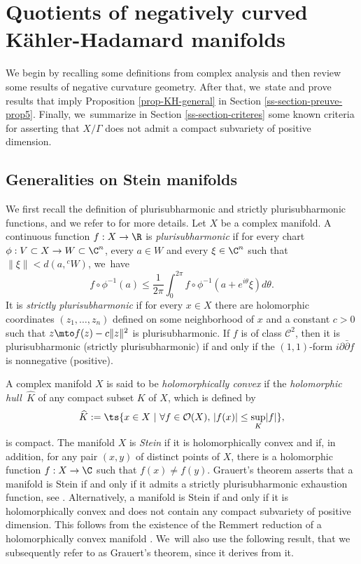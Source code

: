 \section{Quotients of negatively curved Kähler-Hadamard manifolds}\label{section-kahler-hadamard}

We begin by recalling some definitions from complex analysis and then review some results of negative curvature geometry. After that, we~state and prove results that imply Proposition \ref{prop-KH-general} in Section \ref{ss-section-preuve-prop5}. Finally, we~summarize in Section \ref{ss-section-criteres} some known criteria for asserting that $X/\Gamma$ does not admit a compact subvariety of positive dimension.

\subsection{Generalities on Stein manifolds}\label{ss-section-stein}

We first recall the definition of plurisubharmonic and strictly plurisubharmonic functions, and we refer to \cite[Ch.\,1]{demaillyComplexAnalyticDifferential-manuel} for more details. Let $X$ be a complex manifold. A continuous function $f:X\to \R$ is \textit{plurisubharmonic} if for every chart $\phi:V\subset X\to W\subset \C^{n}$, every $a\in W$ and every $\xi\in \C^{n}$ such that $\lVert \xi\rVert < d(a,{}^{c}W)$, we~have
\begin{equation*}
f\circ\phi^{-1}(a) \le \frac{1}{2\pi}\int_{0}^{2\pi}f\circ\phi^{-1}(a+e^{i\theta}\xi)d\theta.
\end{equation*}
It is \textit{strictly plurisubharmonic} if for every $x\in X$ there are holomorphic coordinates $(z_1,\dots,z_n)$ defined on some neighborhood of $x$ and a constant $c>0$ such that $z\mto f(z)-c\lVert z\rVert^{2}$ is plurisubharmonic. If $f$ is of class $\mathcal{C}^2$, then it is plurisubharmonic (\resp strictly plurisubharmonic) if and only if the $(1,1)$-form $i\partial\bar\partial f$ is nonnegative (\resp positive).

A complex manifold $X$ is said to be \textit{holomorphically convex} if the \textit{holomorphic hull}~$\widehat{K}$ of any compact subset $K$ of $X$, which is defined by
\begin{equation*}
\widehat{K}:= \ts\{x\in X \ \vert\ \forall f\in \mathcal{O}(X),\, \lvert f(x)\rvert \le \sup_{K}\lvert f\rvert\},
\end{equation*}
is compact. The manifold $X$ is \textit{Stein} if it is holomorphically convex and if, in addition, for any pair $(x,y)$ of distinct points of $X$, there is a holomorphic function $f:X\to \C$ such that $f(x)\ne f(y)$. Grauert's theorem asserts that a manifold is Stein if and only if it admits a strictly plurisubharmonic exhaustion function, see \cite{grauertLeviProblemImbedding1958}. Alternatively, a manifold is Stein if and only if it is holomorphically convex and does not contain any compact subvariety of positive dimension. This follows from the existence of the Remmert reduction of a holomorphically convex manifold \cite[Th.\,2.1]{peternellPseudoconvexityLeviProblem1994}. We~will also use the following result, that we subsequently refer to as Grauert's theorem, since it derives from it.

